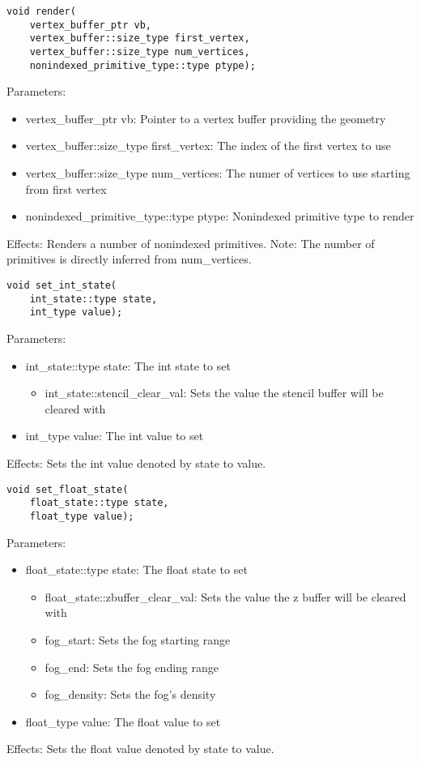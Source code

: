 \documentclass{article}
\begin{document}
\begin{lstlisting}
void render(
	vertex_buffer_ptr vb,
	vertex_buffer::size_type first_vertex,
	vertex_buffer::size_type num_vertices,
 	nonindexed_primitive_type::type ptype);
\end{lstlisting}
Parameters:
\begin{itemize}
\item vertex\_buffer\_ptr vb: Pointer to a vertex buffer providing the geometry
\item vertex\_buffer::size\_type first\_vertex: The index of the first vertex to use
\item vertex\_buffer::size\_type num\_vertices: The numer of vertices to use starting from first vertex
\item nonindexed\_primitive\_type::type ptype: Nonindexed primitive type to render
\end{itemize}
Effects: Renders a number of nonindexed primitives.
Note: The number of primitives is directly inferred from num\_vertices.

\begin{lstlisting}
void set_int_state(
	int_state::type state,
	int_type value);
\end{lstlisting}
Parameters:
\begin{itemize}
\item int\_state::type state: The int state to set
  \begin{itemize}
  \item int\_state::stencil\_clear\_val: Sets the value the stencil buffer will be cleared with
  \end{itemize}
\item int\_type value: The int value to set
\end{itemize}
Effects: Sets the int value denoted by state to value.

\begin{lstlisting}
void set_float_state(
	float_state::type state,
	float_type value);
\end{lstlisting}
Parameters:
\begin{itemize}
\item float\_state::type state: The float state to set
  \begin{itemize}
  \item float\_state::zbuffer\_clear\_val: Sets the value the z buffer will be cleared with
  \item fog\_start: Sets the fog starting range
  \item fog\_end: Sets the fog ending range
  \item fog\_density: Sets the fog's density
  \end{itemize}
\item float\_type value: The float value to set
\end{itemize}
Effects: Sets the float value denoted by state to value.
\end{document}
